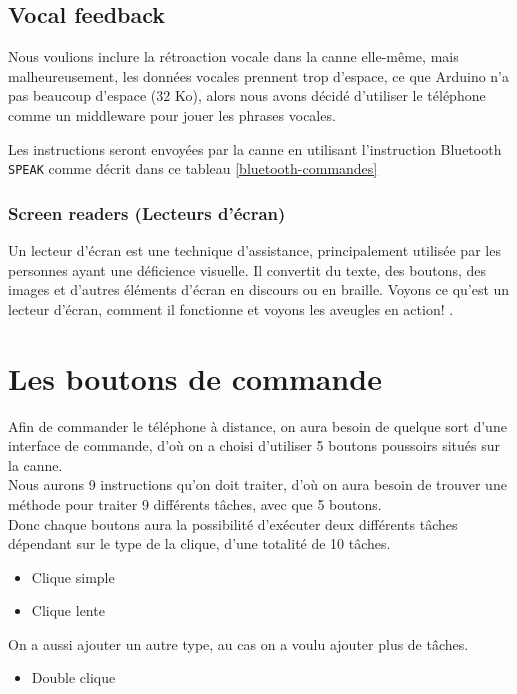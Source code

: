 

\subsection{Vocal feedback}
Nous voulions inclure la rétroaction vocale dans la canne elle-même, mais malheureusement, les données vocales prennent trop d’espace, ce que Arduino n’a pas beaucoup d’espace (32 Ko), alors nous avons décidé d’utiliser le téléphone comme un middleware pour jouer les phrases vocales.

Les instructions seront envoyées par la canne en utilisant l'instruction Bluetooth \verb|SPEAK| comme décrit dans ce tableau \ref{bluetooth-commandes}

\subsubsection*{Screen readers (Lecteurs d'écran)}
Un lecteur d’écran est une technique d’assistance, principalement utilisée par les personnes ayant une déficience visuelle. Il convertit du texte, des boutons, des images et d’autres éléments d’écran en discours ou en braille. Voyons ce qu’est un lecteur d’écran, comment il fonctionne et voyons les aveugles en action! \cite{what-is-screen-reader}.

\section{Les boutons de commande}

Afin de commander le téléphone à distance, on aura besoin de quelque sort d'une interface de commande, d'où on a choisi d'utiliser 5 boutons poussoirs situés sur la canne. \\
Nous aurons 9 instructions qu'on doit traiter, d'où on aura besoin de trouver une méthode pour traiter 9 différents tâches, avec que 5 boutons. \\
Donc chaque boutons aura la possibilité d'exécuter deux différents tâches dépendant sur le type de la clique, d'une totalité de 10 tâches.
\begin{itemize}
    \item Clique simple
    \item Clique lente
\end{itemize}

On a aussi ajouter un autre type, au cas on a voulu ajouter plus de tâches.
\begin{itemize}
    \item Double clique
\end{itemize}

